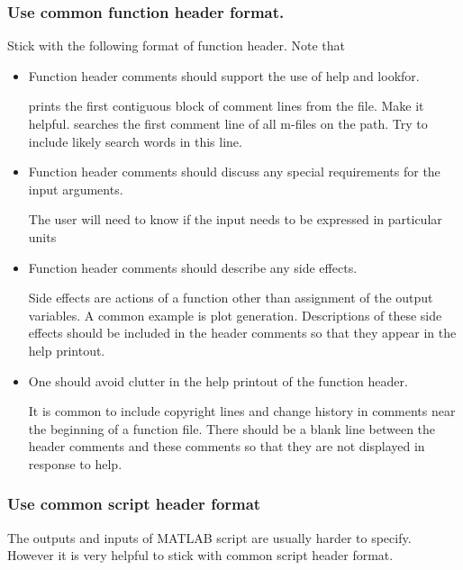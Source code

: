 \documentclass[titlepage,a4paper,12pt]{article}
\begin{document}
\subsubsection{Use common function header format.}
Stick with the following format of function header.
Note that
\begin{itemize}

\item Function header comments should support the use of help and
lookfor.

 prints the first contiguous block of comment lines from the
file. Make it helpful.  searches the first comment line of
all m-files on the path. Try to include likely search words in this
line.

\item Function header comments should discuss any special requirements for
the input arguments.

 The user will need to know if the input needs
to be expressed in particular units
\begin{verbmcode}
\end{verbmcode}

\item Function header comments should describe any side
effects.

Side effects are actions of a function other than assignment of the
output variables. A common example is plot generation. Descriptions
of these side effects should be included in the header comments so
that they appear in the help printout.

\item One should avoid clutter in the help printout
of the function header.

 It is common to include copyright lines and
change history in comments near the beginning of a function file.
There should be a blank line between the header comments and these
comments so that they are not displayed in response to help.

\end{itemize}

\subsubsection{Use common script header format}
The outputs and inputs of MATLAB script are usually harder to specify.
However it is very helpful to stick with common script header format.
\end{document}
